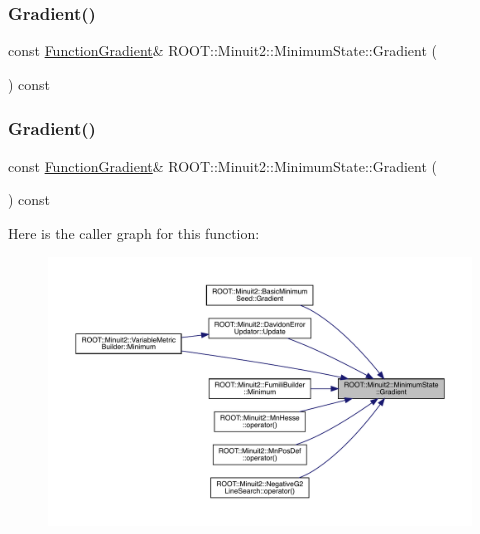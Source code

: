 \subsubsection{\texorpdfstring{Gradient()}{Gradient()}\hspace{0.1cm}{\footnotesize\ttfamily [1/3]}}
{\footnotesize\ttfamily const \mbox{\hyperlink{classROOT_1_1Minuit2_1_1FunctionGradient}{Function\+Gradient}}\& R\+O\+O\+T\+::\+Minuit2\+::\+Minimum\+State\+::\+Gradient (\begin{DoxyParamCaption}{ }\end{DoxyParamCaption}) const\hspace{0.3cm}{\ttfamily [inline]}}

\mbox{\label{classROOT_1_1Minuit2_1_1MinimumState_a08a0d667e1f89522a29c49c9c02e642d}} 
\subsubsection{\texorpdfstring{Gradient()}{Gradient()}\hspace{0.1cm}{\footnotesize\ttfamily [2/3]}}
{\footnotesize\ttfamily const \mbox{\hyperlink{classROOT_1_1Minuit2_1_1FunctionGradient}{Function\+Gradient}}\& R\+O\+O\+T\+::\+Minuit2\+::\+Minimum\+State\+::\+Gradient (\begin{DoxyParamCaption}{ }\end{DoxyParamCaption}) const\hspace{0.3cm}{\ttfamily [inline]}}

Here is the caller graph for this function\+:
\nopagebreak
\begin{figure}[H]
\begin{center}
\leavevmode
\includegraphics[width=350pt]{db/dcd/classROOT_1_1Minuit2_1_1MinimumState_a08a0d667e1f89522a29c49c9c02e642d_icgraph}
\end{center}
\end{figure}
\mbox{\label{classROOT_1_1Minuit2_1_1MinimumState_a08a0d667e1f89522a29c49c9c02e642d}} 
